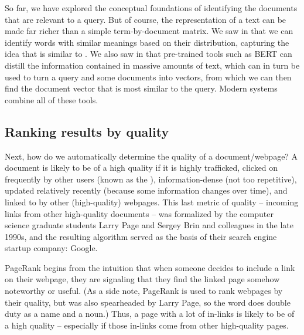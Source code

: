 So far, we have explored the conceptual foundations of identifying the documents that are relevant to a query.  But of course, the representation of a text can be made far richer than a simple term-by-document matrix.  We saw in  that we can identify words with similar meanings based on their distribution, capturing the idea that  is similar to .  We also saw in  that pre-trained tools such as BERT can distill the information contained in massive amounts of text, which can in turn be used to turn a query and some documents into vectors, from which we can then find the document vector that is most similar to the query.  Modern systems combine all of these tools.



\subsection{Ranking results by quality}

Next, how do we automatically determine the quality of a document/webpage?  A document is likely to be of a high quality if it is highly trafficked, clicked on frequently by other users (known as the ), information-dense (not too repetitive), updated relatively recently (because some information changes over time), and linked to by other (high-quality) webpages.  This last metric of quality -- incoming links from other high-quality documents -- was formalized by the computer science graduate students Larry Page and Sergey Brin and colleagues in the late 1990s, and the resulting  algorithm \citep{pagerank:99} served as the basis of their search engine startup company: Google. 

PageRank begins from the intuition that when someone decides to include a link on their webpage, they are signaling that they find the linked page somehow noteworthy or useful.   (As a side note, PageRank is used to rank webpages by their quality, but was also spearheaded by Larry Page, so the word  does double duty as a name and a noun.)   Thus, a page with a lot of in-links is likely to be of a high quality -- especially if those in-links come from other high-quality pages.


